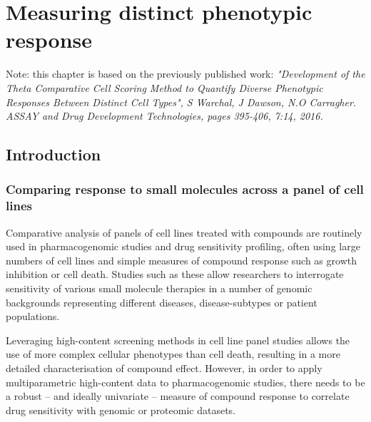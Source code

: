 \documentclass[a4paper,11pt,twoside,openright]{scrbook}
\begin{document}



\chapter{Measuring distinct phenotypic response} \label{chapter:tccs}

\scriptsize{Note: this chapter is based on the previously published work: \textit{"Development of the Theta Comparative Cell Scoring Method to Quantify Diverse Phenotypic Responses Between Distinct Cell Types", S Warchal, J Dawson, N.O Carragher. ASSAY and Drug Development Technologies, pages 395-406, 7:14, 2016.}}



\section{Introduction}
\normalsize
\subsection{Comparing response to small molecules across a panel of cell lines}
Comparative analysis of panels of cell lines treated with compounds are routinely used in pharmacogenomic studies and drug sensitivity profiling, often using large numbers of cell lines and simple measures of compound response such as growth inhibition or cell death.
Studies such as these allow researchers to interrogate sensitivity of various small molecule therapies in a number of genomic backgrounds representing different diseases, disease-subtypes or patient populations.

Leveraging high-content screening methods in cell line panel studies allows the use of more complex cellular phenotypes than cell death, resulting in a more detailed characterisation of compound effect.
However, in order to apply multiparametric high-content data to pharmacogenomic studies, there needs to be a robust -- and ideally univariate -- measure of compound response to correlate drug sensitivity with genomic or proteomic datasets.
\end{document}

